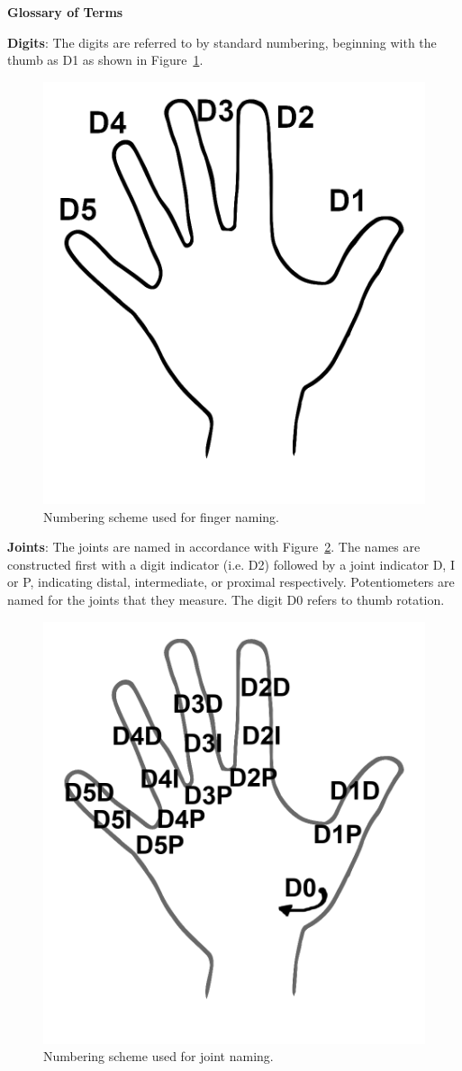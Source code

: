 \documentclass[
11pt, %
oneside, %
english, %
headsepline, %
chapterinoneline, %
openany, %
]{Manual} %
\begin{document}
\tableofcontents %

\listoftables %

\listoffigures %


\newpage
{}
\noindent\textbf{\Huge{Glossary of Terms}}
\vspace{1cm}

\noindent\textbf{Digits}: The digits are referred to by standard numbering, beginning with the thumb as D1 as shown in Figure~\ref{fig:finger_nums}.
\begin{figure}[H]
\centering
\includegraphics[width=0.3\linewidth]{Figures/Finger_Numbering.png}
\caption{Numbering scheme used for finger naming.}
\label{fig:finger_nums}
\end{figure}
\noindent\textbf{Joints}: The joints are named in accordance with Figure~\ref{fig:joint_nums}. The names are constructed first with a digit indicator (i.e. D2) followed by a joint indicator D, I or P, indicating distal, intermediate, or proximal respectively. Potentiometers are named for the joints that they measure. The digit D0 refers to thumb rotation.
\begin{figure}[H]
\centering
\includegraphics[width=0.3\linewidth]{Figures/Joint_Numbering.png}
\caption{Numbering scheme used for joint naming.}
\label{fig:joint_nums}
\end{figure}
\end{document}
